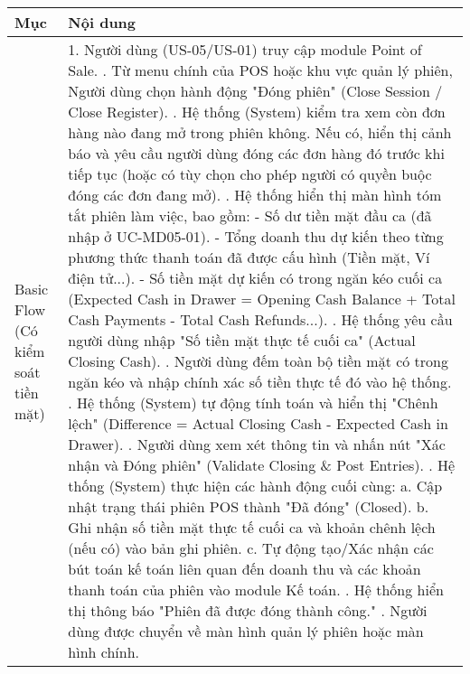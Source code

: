 \begin{longtable}{|m{4cm}|p{11cm}|}
\hline
\textbf{Mục} & \textbf{Nội dung} \\
\hline
Basic Flow (Có kiểm soát tiền mặt) & 1. Người dùng (US-05/US-01) truy cập module Point of Sale. \newline 2. Từ menu chính của POS hoặc khu vực quản lý phiên, Người dùng chọn hành động "Đóng phiên" (Close Session / Close Register). \newline 3. Hệ thống (System) kiểm tra xem còn đơn hàng nào đang mở trong phiên không. Nếu có, hiển thị cảnh báo và yêu cầu người dùng đóng các đơn hàng đó trước khi tiếp tục (hoặc có tùy chọn cho phép người có quyền buộc đóng các đơn đang mở). \newline 4. Hệ thống hiển thị màn hình tóm tắt phiên làm việc, bao gồm: \newline    - Số dư tiền mặt đầu ca (đã nhập ở UC-MD05-01). \newline    - Tổng doanh thu dự kiến theo từng phương thức thanh toán đã được cấu hình (Tiền mặt, Ví điện tử...). \newline    - Số tiền mặt dự kiến có trong ngăn kéo cuối ca (Expected Cash in Drawer = Opening Cash Balance + Total Cash Payments - Total Cash Refunds...). \newline 5. Hệ thống yêu cầu người dùng nhập "Số tiền mặt thực tế cuối ca" (Actual Closing Cash). \newline 6. Người dùng đếm toàn bộ tiền mặt có trong ngăn kéo và nhập chính xác số tiền thực tế đó vào hệ thống. \newline 7. Hệ thống (System) tự động tính toán và hiển thị "Chênh lệch" (Difference = Actual Closing Cash - Expected Cash in Drawer). \newline 8. Người dùng xem xét thông tin và nhấn nút "Xác nhận và Đóng phiên" (Validate Closing \& Post Entries). \newline 9. Hệ thống (System) thực hiện các hành động cuối cùng: \newline    a. Cập nhật trạng thái phiên POS thành "Đã đóng" (Closed). \newline    b. Ghi nhận số tiền mặt thực tế cuối ca và khoản chênh lệch (nếu có) vào bản ghi phiên. \newline    c. Tự động tạo/Xác nhận các bút toán kế toán liên quan đến doanh thu và các khoản thanh toán của phiên vào module Kế toán. \newline 10. Hệ thống hiển thị thông báo "Phiên đã được đóng thành công." \newline 11. Người dùng được chuyển về màn hình quản lý phiên hoặc màn hình chính. \\

\end{longtable}
